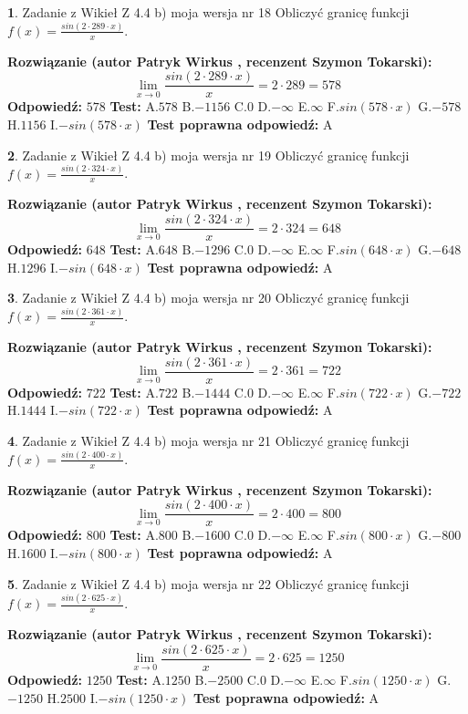 \documentclass[12pt, a4paper]{article}
\theoremstyle{definition} %
\newtheorem{zad}{}
\newcommand{\zadStart}[1]{\begin{zad}#1\newline}
\newcommand{\zadStop}{\end{zad}}
\newcommand{\rozwStart}[2]{\noindent \textbf{Rozwiązanie (autor #1 , recenzent #2): }\newline}
\newcommand{\rozwStop}{\newline}
\newcommand{\odpStart}{\noindent \textbf{Odpowiedź:}\newline}
\newcommand{\odpStop}{\newline}
\newcommand{\testStart}{\noindent \textbf{Test:}\newline}
\newcommand{\testStop}{\newline}
\newcommand{\kluczStart}{\noindent \textbf{Test poprawna odpowiedź:}\newline}
\newcommand{\kluczStop}{\newline}
\begin{document}
\zadStart{Zadanie z Wikieł Z 4.4 b) moja wersja nr 18}
Obliczyć granicę funkcji $f(x)=\frac{sin(2 \cdot289\cdot x)}{x}$.
\zadStop
\rozwStart{Patryk Wirkus}{Szymon Tokarski}
$$\lim\limits_{x\to 0}\frac{sin(2 \cdot 289\cdot x)}{x}=
2 \cdot 289 = 578$$
\rozwStop
\odpStart
$578$
\odpStop
\testStart
A.$578$
B.$-1156$
C.$0$
D.$-\infty$
E.$\infty$
F.$sin(578\cdot x)$
G.$-578$
H.$1156$
I.$-sin(578\cdot x)$
\testStop
\kluczStart
A
\kluczStop



\zadStart{Zadanie z Wikieł Z 4.4 b) moja wersja nr 19}
Obliczyć granicę funkcji $f(x)=\frac{sin(2 \cdot324\cdot x)}{x}$.
\zadStop
\rozwStart{Patryk Wirkus}{Szymon Tokarski}
$$\lim\limits_{x\to 0}\frac{sin(2 \cdot 324\cdot x)}{x}=
2 \cdot 324 = 648$$
\rozwStop
\odpStart
$648$
\odpStop
\testStart
A.$648$
B.$-1296$
C.$0$
D.$-\infty$
E.$\infty$
F.$sin(648\cdot x)$
G.$-648$
H.$1296$
I.$-sin(648\cdot x)$
\testStop
\kluczStart
A
\kluczStop



\zadStart{Zadanie z Wikieł Z 4.4 b) moja wersja nr 20}
Obliczyć granicę funkcji $f(x)=\frac{sin(2 \cdot361\cdot x)}{x}$.
\zadStop
\rozwStart{Patryk Wirkus}{Szymon Tokarski}
$$\lim\limits_{x\to 0}\frac{sin(2 \cdot 361\cdot x)}{x}=
2 \cdot 361 = 722$$
\rozwStop
\odpStart
$722$
\odpStop
\testStart
A.$722$
B.$-1444$
C.$0$
D.$-\infty$
E.$\infty$
F.$sin(722\cdot x)$
G.$-722$
H.$1444$
I.$-sin(722\cdot x)$
\testStop
\kluczStart
A
\kluczStop



\zadStart{Zadanie z Wikieł Z 4.4 b) moja wersja nr 21}
Obliczyć granicę funkcji $f(x)=\frac{sin(2 \cdot400\cdot x)}{x}$.
\zadStop
\rozwStart{Patryk Wirkus}{Szymon Tokarski}
$$\lim\limits_{x\to 0}\frac{sin(2 \cdot 400\cdot x)}{x}=
2 \cdot 400 = 800$$
\rozwStop
\odpStart
$800$
\odpStop
\testStart
A.$800$
B.$-1600$
C.$0$
D.$-\infty$
E.$\infty$
F.$sin(800\cdot x)$
G.$-800$
H.$1600$
I.$-sin(800\cdot x)$
\testStop
\kluczStart
A
\kluczStop



\zadStart{Zadanie z Wikieł Z 4.4 b) moja wersja nr 22}
Obliczyć granicę funkcji $f(x)=\frac{sin(2 \cdot625\cdot x)}{x}$.
\zadStop
\rozwStart{Patryk Wirkus}{Szymon Tokarski}
$$\lim\limits_{x\to 0}\frac{sin(2 \cdot 625\cdot x)}{x}=
2 \cdot 625 = 1250$$
\rozwStop
\odpStart
$1250$
\odpStop
\testStart
A.$1250$
B.$-2500$
C.$0$
D.$-\infty$
E.$\infty$
F.$sin(1250\cdot x)$
G.$-1250$
H.$2500$
I.$-sin(1250\cdot x)$
\testStop
\kluczStart
A
\kluczStop
\end{document}
